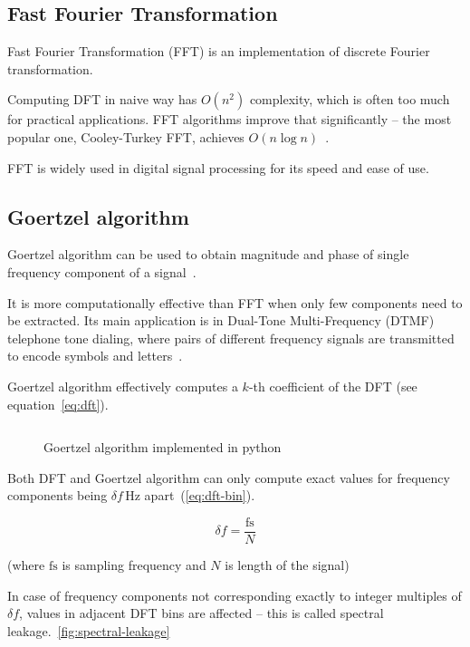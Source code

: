 \documentclass[english,bachelor,a4paper,oneside]{ppfcmthesis}
\begin{document}
\subsection{Fast Fourier Transformation}
\label{subsec:fft}

Fast Fourier Transformation (FFT) is an implementation of discrete Fourier transformation.

Computing DFT in naive way has $O(n^{2})$ complexity, which is often too much for practical applications.
FFT algorithms improve that significantly -- the most popular one, Cooley-Turkey FFT, achieves $O(n\log{n})$~\cite{JOSDFT}.

FFT is widely used in digital signal processing for its speed and ease of use.

\subsection{Goertzel algorithm}
\label{subsec:goertzel}

Goertzel algorithm can be used to obtain magnitude and phase of single frequency component of a signal~\cite{PS12}.

It is more computationally effective than FFT when only few components need to be extracted. Its main application is in
Dual-Tone Multi-Frequency (DTMF) telephone tone dialing, where pairs of different frequency signals are transmitted to encode symbols and letters~\cite{DTMF}.

Goertzel algorithm effectively computes a $k$-th coefficient of the DFT (see equation~\ref{eq:dft}).

\begin{figure}[h]
\centering
\inputminted[linenos]{python}{listings/goertzel.py}
\caption{Goertzel algorithm implemented in python}
\label{fig:goertzel-python}
\end{figure}

Both DFT and Goertzel algorithm can only compute exact values for frequency components being $\delta f$\,Hz apart~(\ref{eq:dft-bin}).

\begin{equation}
\label{eq:dft-bin}
\delta f = \frac{\textrm{fs}}{N}
\end{equation}

(where $\textrm{fs}$ is sampling frequency and $N$ is length of the signal)

In case of frequency components not corresponding exactly to integer multiples of $\delta f$, values in adjacent DFT bins are affected -- this is called spectral leakage.~\ref{fig:spectral-leakage}
\end{document}
